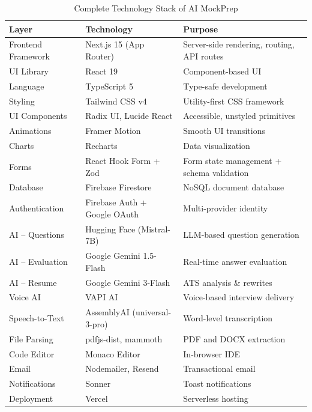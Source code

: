 \documentclass[12pt,a4paper,oneside]{report}
\begin{document}
\begin{table}[H]
\centering
\caption{Complete Technology Stack of AI MockPrep}
\label{tab:tech_stack}
\begin{tabular}{|p{3.5cm}|p{5cm}|p{5cm}|}
\hline
\textbf{Layer} & \textbf{Technology} & \textbf{Purpose} \\
\hline
Frontend Framework & Next.js 15 (App Router) & Server-side rendering, routing, API routes \\
\hline
UI Library & React 19 & Component-based UI \\
\hline
Language & TypeScript 5 & Type-safe development \\
\hline
Styling & Tailwind CSS v4 & Utility-first CSS framework \\
\hline
UI Components & Radix UI, Lucide React & Accessible, unstyled primitives \\
\hline
Animations & Framer Motion & Smooth UI transitions \\
\hline
Charts & Recharts & Data visualization \\
\hline
Forms & React Hook Form + Zod & Form state management + schema validation \\
\hline
Database & Firebase Firestore & NoSQL document database \\
\hline
Authentication & Firebase Auth + Google OAuth & Multi-provider identity \\
\hline
AI -- Questions & Hugging Face (Mistral-7B) & LLM-based question generation \\
\hline
AI -- Evaluation & Google Gemini 1.5-Flash & Real-time answer evaluation \\
\hline
AI -- Resume & Google Gemini 3-Flash & ATS analysis \& rewrites \\
\hline
Voice AI & VAPI AI & Voice-based interview delivery \\
\hline
Speech-to-Text & AssemblyAI (universal-3-pro) & Word-level transcription \\
\hline
File Parsing & pdfjs-dist, mammoth & PDF and DOCX extraction \\
\hline
Code Editor & Monaco Editor & In-browser IDE \\
\hline
Email & Nodemailer, Resend & Transactional email \\
\hline
Notifications & Sonner & Toast notifications \\
\hline
Deployment & Vercel & Serverless hosting \\
\hline
\end{tabular}
\end{table}
\end{document}
